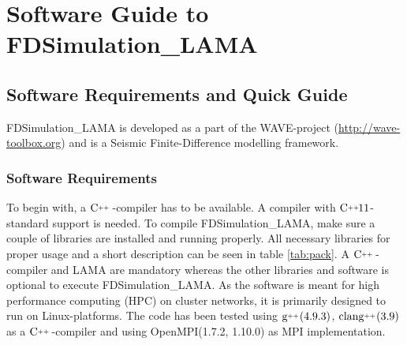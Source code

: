 \documentclass[pdftex,a4paper,parskip,listof=totoc,bibliography=totoc,onehalfspacing,12pt]{scrreprt}
\newcommand{\CC}[1][]{$\text{C\hspace{0ex}}^{_{_{_{++}}}}					%
                      \ifthenelse{\equal{#1}{}}{}{\text{\hspace{-.625ex}#1}}$}
\newcommand{\clang}[1][]{$\text{clang\hspace{0ex}}^{_{_{_{++}}}}		%
                      \ifthenelse{\equal{#1}{}}{}{\text{\hspace{-.25ex}(#1)}}$}
\newcommand{\gCC}[1][]{$\text{g\hspace{0ex}}^{_{_{_{++}}}}				%
                      \ifthenelse{\equal{#1}{}}{}{\text{\hspace{-.25ex}(#1)}}$}
\begin{document}
\part{Software Guide to FDSimulation\_LAMA}
\chapter{Software Requirements and Quick Guide}

FDSimulation\_LAMA is developed as a part of the WAVE-project (\url{http://wave-toolbox.org}) and is a Seismic Finite-Difference modelling framework. 

\section{Software Requirements}

To begin with, a \CC-compiler has to be available. A compiler with  \CC[11]-standard support is needed. To compile FDSimulation\_LAMA, make sure a couple of libraries are installed and running properly. All necessary libraries for proper usage and a short description can be seen in table \ref{tab:pack}. A \CC-compiler and LAMA are mandatory whereas the other libraries and software is optional to execute FDSimulation\_LAMA.
As the software is meant for high performance computing (HPC) on cluster networks, it is primarily designed to run on Linux-platforms. The code has been tested using \gCC[4.9.3], \clang[3.9] as a  \CC-compiler and using OpenMPI(1.7.2, 1.10.0) as MPI implementation.
\end{document}
